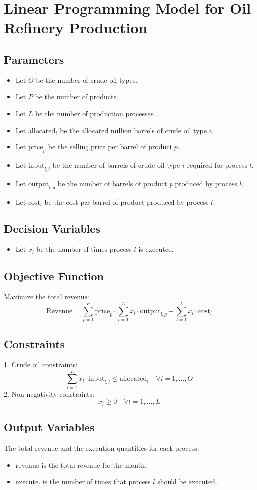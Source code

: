 \documentclass{article}
\begin{document}
\section*{Linear Programming Model for Oil Refinery Production}

\subsection*{Parameters}
\begin{itemize}
    \item Let \( O \) be the number of crude oil types.
    \item Let \( P \) be the number of products.
    \item Let \( L \) be the number of production processes.
    \item Let \( \text{allocated}_i \) be the allocated million barrels of crude oil type \( i \).
    \item Let \( \text{price}_p \) be the selling price per barrel of product \( p \).
    \item Let \( \text{input}_{l,i} \) be the number of barrels of crude oil type \( i \) required for process \( l \).
    \item Let \( \text{output}_{l,p} \) be the number of barrels of product \( p \) produced by process \( l \).
    \item Let \( \text{cost}_l \) be the cost per barrel of product produced by process \( l \).
\end{itemize}

\subsection*{Decision Variables}
\begin{itemize}
    \item Let \( x_l \) be the number of times process \( l \) is executed.
\end{itemize}

\subsection*{Objective Function}
Maximize the total revenue:
\[
\text{Revenue} = \sum_{p=1}^{P} \text{price}_p \cdot \sum_{l=1}^{L} x_l \cdot \text{output}_{l,p} - \sum_{l=1}^{L} x_l \cdot \text{cost}_l
\]

\subsection*{Constraints}
1. Crude oil constraints:
\[
\sum_{l=1}^{L} x_l \cdot \text{input}_{l,i} \leq \text{allocated}_i \quad \forall i = 1, \ldots, O
\]
2. Non-negativity constraints:
\[
x_l \geq 0 \quad \forall l = 1, \ldots, L
\]

\subsection*{Output Variables}
The total revenue and the execution quantities for each process:
\begin{itemize}
    \item \( \text{revenue} \) is the total revenue for the month.
    \item \( \text{execute}_l \) is the number of times that process \( l \) should be executed.
\end{itemize}
\end{document}
